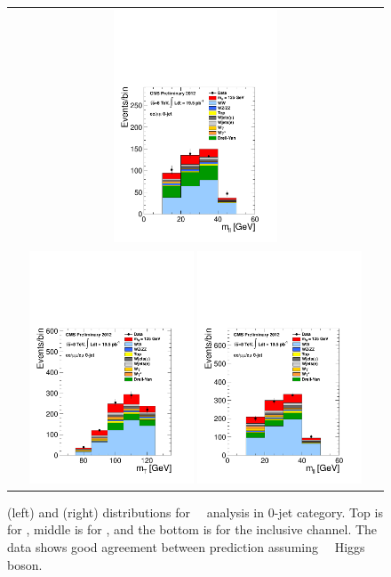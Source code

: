 \begin{figure}[htp]
\begin{tabular}{c}
\includegraphics[width=0.45\textwidth]{figures/hww_analysis17_125_ALL_sf_0j_mll.pdf}
\\
\includegraphics[width=0.45\textwidth]{figures/hww_analysis17_125_ALL_incl_0j_mt.pdf}
\includegraphics[width=0.45\textwidth]{figures/hww_analysis17_125_ALL_incl_0j_mll.pdf}
\end{tabular} 
\caption{ \mT(left) and \mll(right) distributions for ~\GeV\ analysis 
in 0-jet category. 
Top is for \DF, middle is for \SF, and the bottom is for the inclusive channel.  
The data shows good agreement between prediction assuming ~\GeV\ Higgs boson.} 
\label{fig:cutbased125_0jet} 
\end{figure} 
